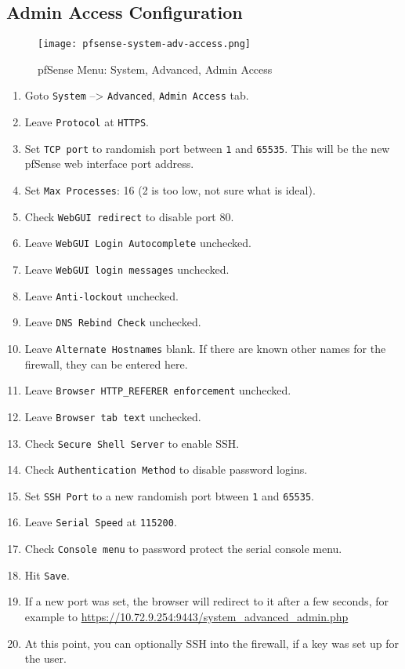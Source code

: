 \subsection{Admin Access Configuration}
\begin{figure}[h!]
\begin{center}
\texttt{[image: pfsense-system-adv-access.png]}
 \caption{pfSense Menu: System, Advanced, Admin Access}
 \label{fig:pfsense-system-adv-access}
\end{center}
\end{figure}
\begin{enumerate}
 \item Goto \texttt{System} --> \texttt{Advanced}, \texttt{Admin Access} tab.
 \item Leave \texttt{Protocol} at \texttt{HTTPS}.
 \item Set \texttt{TCP port} to randomish port between \texttt{1} and \texttt{65535}. This will be the new pfSense web interface port address.
 \item Set \texttt{Max Processes}: 16 (2 is too low, not sure what is ideal).
 \item Check \texttt{WebGUI redirect} to disable port 80.
 
 \item Leave \texttt{WebGUI Login Autocomplete} unchecked.
 \item Leave \texttt{WebGUI login messages} unchecked.
 \item Leave \texttt{Anti-lockout} unchecked.
 \item Leave \texttt{DNS Rebind Check} unchecked.
 \item Leave \texttt{Alternate Hostnames} blank. If there are known other names for the firewall, they can be entered here.
 \item Leave \texttt{Browser HTTP\_REFERER enforcement} unchecked.
 \item Leave \texttt{Browser tab text} unchecked.
 \item Check \texttt{Secure Shell Server} to enable SSH.
 \item Check \texttt{Authentication Method} to disable password logins.
 \item Set \texttt{SSH Port} to a new randomish port btween \texttt{1} and \texttt{65535}.
 \item Leave \texttt{Serial Speed} at \texttt{115200}.
 \item Check \texttt{Console menu} to password protect the serial console menu.
 \item Hit \texttt{Save}.
 \item If a new port was set, the browser will redirect to it after a few seconds, for example to \url{https://10.72.9.254:9443/system_advanced_admin.php}
 \item At this point, you can optionally SSH into the firewall, if a key was set up for the user.
\end{enumerate}

